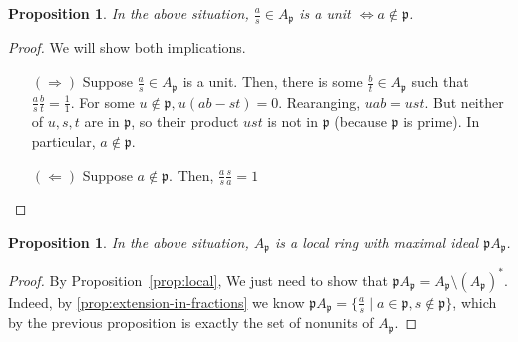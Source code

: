 \documentclass[11pt]{article}
\newtheorem{prop}[theorem]{Proposition}
\theoremstyle{definition}
\begin{document}
        \begin{prop}
            In the above situation, $\frac{a}{s} \in A_{\mathfrak{p}}$ is a unit $\iff a \notin \mathfrak{p}$.
        \end{prop}
            \begin{proof}
                We will show both implications.
                \begin{itemize}
                    \item[$(\Rightarrow)$] Suppose $\frac{a}{s} \in A_{\mathfrak{p}}$ is a unit.
                    Then, there is some $\frac{b}{t} \in A_{\mathfrak{p}}$ such that $\frac{a}{s} \frac{b}{t} = \frac{1}{1}$.
                    For some $u \notin \mathfrak{p}, u (ab - st) = 0$.
                    Rearanging, $uab = ust$.
                    But neither of $u, s, t$ are in $\mathfrak{p}$, so their product $ust$ is not in $\mathfrak{p}$ (because $\mathfrak{p}$ is prime).
                    In particular, $a \notin \mathfrak{p}$.
                    \item[$(\Leftarrow)$] Suppose $a \notin \mathfrak{p}$.
                    Then, $\frac{a}{s} \frac{s}{a} = 1$
                \end{itemize}
            \end{proof}

        \begin{prop}
            In the above situation, $A_{\mathfrak{p}}$ is a local ring with maximal ideal
            $\mathfrak{p}A_{\mathfrak{p}}$.
        \end{prop}
            \begin{proof}
                
                By Proposition~\ref{prop:local}, We just need to show that $\mathfrak{p}A_{\mathfrak{p}} = A_{\mathfrak{p}} \setminus (A_{\mathfrak{p}})^*$.
                Indeed, by \ref{prop:extension-in-fractions} we know $\mathfrak{p}A_{\mathfrak{p}} = \{\frac{a}{s} \mid a \in \mathfrak{p}, s \notin \mathfrak{p} \}$, which by the previous proposition
                is exactly the set of nonunits of $A_{\mathfrak{p}}$.

            \end{proof}
\end{document}
